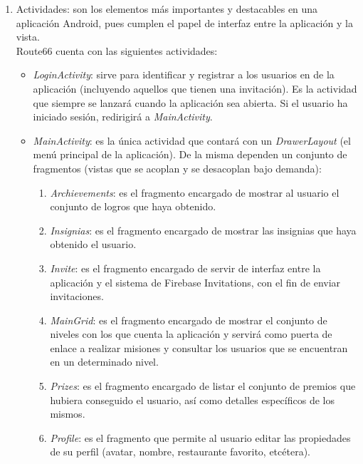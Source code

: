 \documentclass[twoside]{report}
\begin{document}
\begin{enumerate}
\item Actividades: son los elementos más importantes y destacables en una aplicación Android, pues cumplen el papel de interfaz entre la aplicación y la vista.\\
Route66 cuenta con las siguientes actividades:

	\begin{itemize}
	\item \textit{LoginActivity}: sirve para identificar y registrar a los usuarios en de la aplicación (incluyendo aquellos que tienen una invitación). Es la actividad que siempre se lanzará cuando la aplicación sea abierta. Si el usuario ha iniciado sesión, redirigirá  a \textit{MainActivity}.
	
	\item \textit{MainActivity}: es la única actividad que contará con un \textit{DrawerLayout} (el menú principal de la aplicación). De la misma dependen un conjunto de fragmentos (vistas que se acoplan y se desacoplan bajo demanda):
	
		\begin{enumerate}
			\item \textit{Archievements}: es el fragmento encargado de mostrar al usuario el conjunto de logros que haya obtenido.
			
			\item \textit{Insignias}: es el fragmento encargado de mostrar las insignias que haya obtenido el usuario.
			
			\item \textit{Invite}: es el fragmento encargado de servir de interfaz entre la aplicación y el sistema de Firebase Invitations, con el fin de enviar invitaciones.
			
			\item \textit{MainGrid}: es el fragmento encargado de mostrar el conjunto de niveles con los que cuenta la aplicación y servirá como puerta de enlace a realizar misiones y consultar los usuarios que se encuentran en un determinado nivel.
			
			\item \textit{Prizes}: es el fragmento encargado de listar el conjunto de premios que hubiera conseguido el usuario, así como detalles específicos de los mismos.
			
			\item \textit{Profile}: es el fragmento que permite al usuario editar las propiedades de su perfil (avatar, nombre, restaurante favorito, etcétera).
			

\end{enumerate}
\end{itemize}
\end{enumerate}
\end{document}
